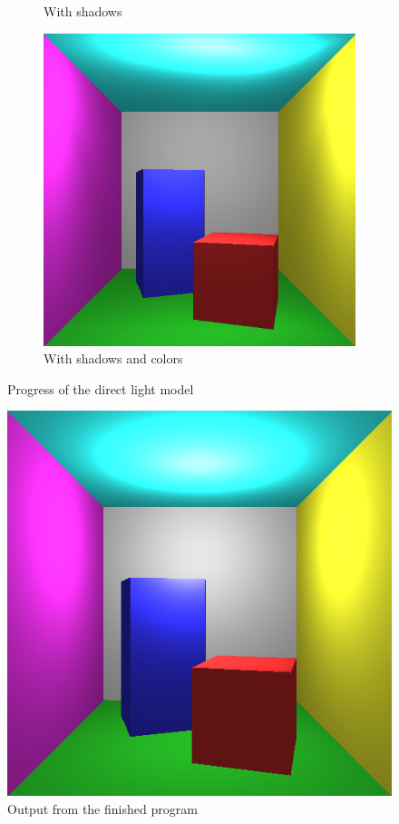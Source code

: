 \documentclass[a4paper,11pt]{article}
\begin{document}
\begin{figure}[h!]
\begin{subfigure}[h!]{0.3\linewidth}
		\caption{With shadows}
		\label{fig3}
	\end{subfigure}
	\begin{subfigure}[h!]{0.3\linewidth}
		\centering
		\includegraphics[width=\linewidth]{screenshot4.png}
		\caption{With shadows and colors}
		\label{fig4}
	\end{subfigure}
	\caption{Progress of the direct light model}
\end{figure}

\begin{figure}[h!]
	\centering	
	\includegraphics[width=0.45\linewidth]{screenshot5.png}
	\caption{Output from the finished program}
	\label{fig5}
\end{figure}
\end{document}
